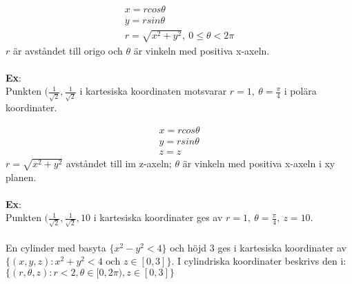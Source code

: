 \documentclass{report}
\begin{document}
{
\begin{align*}
x = r cos \theta\\
y = r sin \theta \\
r = \sqrt{x^2+y^2}, \: 0 \le \theta < 2\pi 
\end{align*}
$ r $ är avståndet till origo och $ \theta $ är vinkeln med positiva x-axeln.\\\\

\textbf{Ex}:\\
Punkten $ ( \frac{1}{ \sqrt{2} }, \frac{1}{ \sqrt{2} }   $ i kartesiska koordinaten motsvarar $ r = 1, \: \theta = \frac{\pi}{4}  $ i polära koordinater.
}

{
\begin{align*}
x = r cos\theta\\
y = r sin\theta \\
z = z
\end{align*}
$ r = \sqrt{x^2+y^2}  $ avståndet till im z-axeln; $ \theta $ är vinkeln med positiva x-axeln i xy planen. \\\\

\textbf{Ex}:\\
Punkten $ ( \frac{1}{ \sqrt{2} } , \frac{1}{ \sqrt{2} } , 10 $ i kartesiska koordinater ges av $ r = 1, \: \theta = \frac{\pi}{4}, \: z = 10 $.\\\\

En cylinder med basyta $ \{ x^2-y^2 < 4 \} $ och höjd 3 ges i kartesiska koordinater av $ \{ (x,y,z) : x^2+y^2 < 4 \text{ och } z \in  [0,3] \} $. I cylindriska koordinater beskrivs den i: $ \{ (r, \theta, z) : r < 2, \theta \in [0, 2\pi), z \in [0,3] \}$  

}
\end{document}
